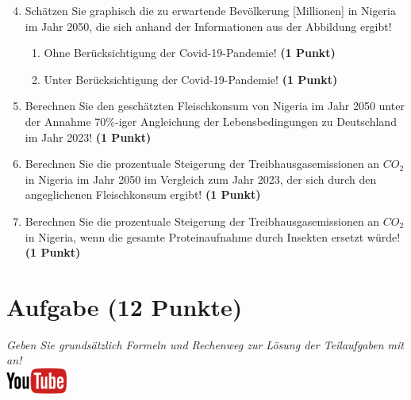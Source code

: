 \documentclass[a4paper, 9pt]{scrartcl}\usepackage[]{graphicx}\usepackage[]{xcolor}
\begin{document}
\begin{enumerate}
  \setcounter{enumi}{3}  
\item Sch{\"a}tzen Sie graphisch die zu erwartende Bev{\"o}lkerung [Millionen] in Nigeria im
  Jahr 2050, die sich anhand der Informationen aus der Abbildung ergibt!
\begin{enumerate}
\item Ohne Ber{\"u}cksichtigung der Covid-19-Pandemie! \textbf{(1
    Punkt)}
\item Unter Ber{\"u}cksichtigung der Covid-19-Pandemie! \textbf{(1
    Punkt)}
\end{enumerate}
\item Berechnen Sie den gesch{\"a}tzten Fleischkonsum von Nigeria im Jahr
  2050 unter der Annahme 70\%-iger Angleichung der Lebensbedingungen zu
  Deutschland im Jahr 2023! \textbf{(1 Punkt)}
\item Berechnen Sie die prozentuale Steigerung der Treibhausgasemissionen
  an $CO_2$ in Nigeria im Jahr 2050 im Vergleich zum Jahr 2023, der
  sich durch den angeglichenen Fleischkonsum ergibt! \textbf{(1 Punkt)}
\item Berechnen Sie die prozentuale Steigerung der Treibhausgasemissionen
  an $CO_2$ in Nigeria, wenn die gesamte Proteinaufnahme 
  durch Insekten ersetzt w{\"u}rde! \textbf{(1
    Punkt)}
\end{enumerate}







 
\clearpage

\section{Aufgabe \hfill (12 Punkte)}

\textit{Geben Sie grunds{\"a}tzlich Formeln und Rechenweg zur L{\"o}sung der
  Teilaufgaben mit an!} \\[1Ex]

\hfill\href{https://youtu.be/flRBo1FWQy0}{\includegraphics[width = 2cm]{img/youtube}} %
\hspace{2Ex}
\end{document}

